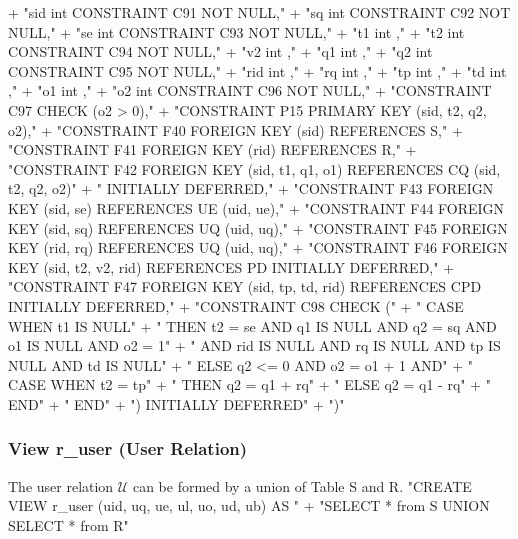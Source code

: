 \documentclass{article}
\def\nwendcode{\endtrivlist \endgroup}
\let\nwdocspar=\par
\theoremstyle{definition}
\begin{document}
  + "sid int  CONSTRAINT C91 NOT NULL,"
  + "sq  int  CONSTRAINT C92 NOT NULL,"
  + "se  int  CONSTRAINT C93 NOT NULL,"
  + "t1  int  ,"
  + "t2  int  CONSTRAINT C94 NOT NULL,"
  + "v2  int  ,"
  + "q1  int  ,"
  + "q2  int  CONSTRAINT C95 NOT NULL,"
  + "rid int  ,"
  + "rq  int  ,"
  + "tp  int  ,"
  + "td  int  ,"
  + "o1  int  ,"
  + "o2  int  CONSTRAINT C96 NOT NULL,"
  + "CONSTRAINT C97 CHECK (o2 > 0),"
  + "CONSTRAINT P15 PRIMARY KEY (sid, t2, q2, o2),"
  + "CONSTRAINT F40 FOREIGN KEY (sid) REFERENCES S,"
  + "CONSTRAINT F41 FOREIGN KEY (rid) REFERENCES R,"
  + "CONSTRAINT F42 FOREIGN KEY (sid, t1, q1, o1) REFERENCES CQ (sid, t2, q2, o2)"
  + "  INITIALLY DEFERRED,"
  + "CONSTRAINT F43 FOREIGN KEY (sid, se) REFERENCES UE (uid, ue),"
  + "CONSTRAINT F44 FOREIGN KEY (sid, sq) REFERENCES UQ (uid, uq),"
  + "CONSTRAINT F45 FOREIGN KEY (rid, rq) REFERENCES UQ (uid, uq),"
  + "CONSTRAINT F46 FOREIGN KEY (sid, t2, v2, rid) REFERENCES PD INITIALLY DEFERRED,"
  + "CONSTRAINT F47 FOREIGN KEY (sid, tp, td, rid) REFERENCES CPD INITIALLY DEFERRED,"
  + "CONSTRAINT C98 CHECK ("
  + "  CASE WHEN t1 IS NULL"
  + "    THEN t2 = se AND q1 IS NULL AND q2 = sq AND o1 IS NULL AND o2 = 1"
  + "      AND rid IS NULL AND rq IS NULL AND tp IS NULL AND td IS NULL"
  + "    ELSE q2 <= 0 AND o2 = o1 + 1 AND"
  + "      CASE WHEN t2 = tp"
  + "        THEN q2 = q1 + rq"
  + "        ELSE q2 = q1 - rq"
  + "      END"
  + "  END"
  + ") INITIALLY DEFERRED"
  + ")"
\nwendcode{}\nwdocspar

\subsubsection{View r\_user (User Relation)}
The user relation $\mathcal{U}$ can be formed by a union of Table S and R.
\nwenddocs{}\endmoddef{}
"CREATE VIEW r_user (uid, uq, ue, ul, uo, ud, ub) AS "
  + "SELECT * from S UNION SELECT * from R"
\nwendcode{}\nwdocspar
\end{document}
